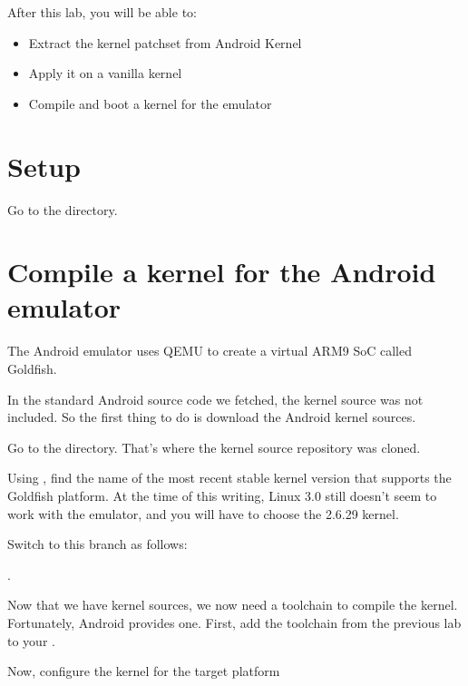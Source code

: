 
After this lab, you will be able to:
\begin{itemize}
  \item Extract the kernel patchset from Android Kernel
  \item Apply it on a vanilla kernel
  \item Compile and boot a kernel for the emulator
\end{itemize}

\section{Setup}

Go to the  directory.

\section{Compile a kernel for the Android emulator}

The Android emulator uses QEMU to create a virtual ARM9 SoC called Goldfish.

In the standard Android source code we fetched, the kernel source was not included.
So the first thing to do is download the Android kernel sources.


Go to the  directory. That's where the kernel source repository
was cloned.

Using , find the name of the most recent stable kernel version that 
supports the Goldfish platform. At the time of this writing, Linux 3.0 still doesn't
seem to work with the emulator, and you will have to choose the 2.6.29 kernel.

Switch to this branch as follows:

.

Now that we have kernel sources, we now need a toolchain to compile the kernel. Fortunately,
Android provides one. First, add the toolchain from the previous lab to your .


Now, configure the kernel for the target platform

